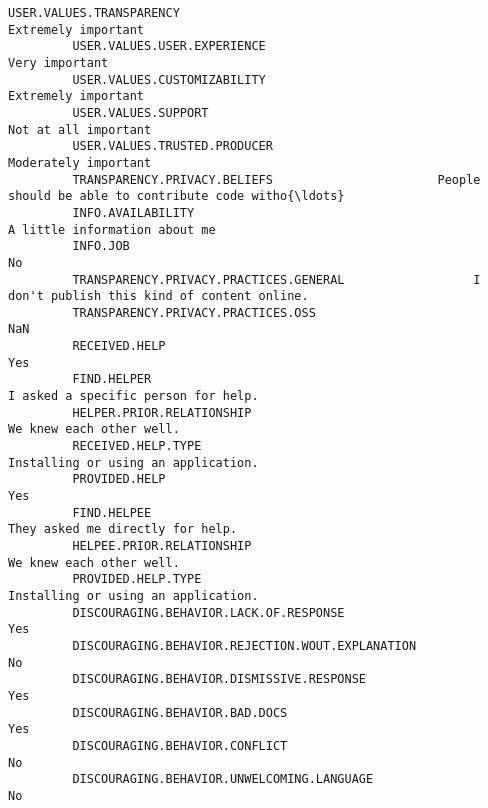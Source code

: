 \documentclass[11pt]{article}
\begin{document}
\begin{Verbatim}[commandchars=\\\{\}]
         USER.VALUES.TRANSPARENCY                                                         Extremely important  
         USER.VALUES.USER.EXPERIENCE                                                           Very important  
         USER.VALUES.CUSTOMIZABILITY                                                      Extremely important  
         USER.VALUES.SUPPORT                                                             Not at all important  
         USER.VALUES.TRUSTED.PRODUCER                                                    Moderately important  
         TRANSPARENCY.PRIVACY.BELIEFS                       People should be able to contribute code witho{\ldots}  
         INFO.AVAILABILITY                                                      A little information about me  
         INFO.JOB                                                                                          No  
         TRANSPARENCY.PRIVACY.PRACTICES.GENERAL                  I don't publish this kind of content online.  
         TRANSPARENCY.PRIVACY.PRACTICES.OSS                                                               NaN  
         RECEIVED.HELP                                                                                    Yes  
         FIND.HELPER                                                      I asked a specific person for help.  
         HELPER.PRIOR.RELATIONSHIP                                                   We knew each other well.  
         RECEIVED.HELP.TYPE                                               Installing or using an application.  
         PROVIDED.HELP                                                                                    Yes  
         FIND.HELPEE                                                         They asked me directly for help.  
         HELPEE.PRIOR.RELATIONSHIP                                                   We knew each other well.  
         PROVIDED.HELP.TYPE                                               Installing or using an application.  
         DISCOURAGING.BEHAVIOR.LACK.OF.RESPONSE                                                           Yes  
         DISCOURAGING.BEHAVIOR.REJECTION.WOUT.EXPLANATION                                                  No  
         DISCOURAGING.BEHAVIOR.DISMISSIVE.RESPONSE                                                        Yes  
         DISCOURAGING.BEHAVIOR.BAD.DOCS                                                                   Yes  
         DISCOURAGING.BEHAVIOR.CONFLICT                                                                    No  
         DISCOURAGING.BEHAVIOR.UNWELCOMING.LANGUAGE                                                        No  

\end{Verbatim}
\end{document}
